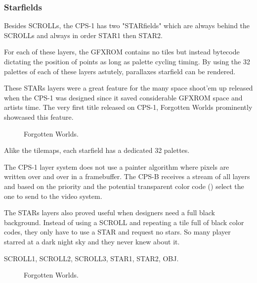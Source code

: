 \subsubsection{Starfields}
Besides SCROLLs, the CPS-1 has two "STARfields" which are always behind the SCROLLs and always in order STAR1 then STAR2. 

For each of these layers, the GFXROM contains no tiles but instead bytecode dictating the position of points as long as palette cycling timing. By using the 32 palettes of each of these layers astutely, parallaxes starfield can be rendered. 

These STARs layers were a great feature for the many space shoot'em up released when the CPS-1 was designed since it saved considerable GFXROM space and artists time. The very first title released on CPS-1, Forgotten Worlds prominently showcased this feature.

\vfill
\begin{figure}[!b]
 \caption*{Forgotten Worlds.}%
 \end{figure}%
\pagebreak

Alike the tilemaps, each starfield has a dedicated 32 palettes.

\begin{trivia}
The CPS-1 layer system does not use a painter algorithm where pixels are written over and over in a framebuffer. The CPS-B receives a stream of all layers and based on the priority and the potential transparent color code () select the one to send to the video system.
\end{trivia}

The STARs layers also proved useful when designers need a full black background. Instead of using a SCROLL and repeating a tile full of black color codes, they only have to use a STAR and request no stars. So many player starred at a dark night sky and they never knew about it.

 SCROLL1,  SCROLL2,  SCROLL3,  STAR1,  STAR2,  OBJ.

\vfill
\begin{figure}[!b]
 \caption*{Forgotten Worlds.}%
 \end{figure}%
\pagebreak









